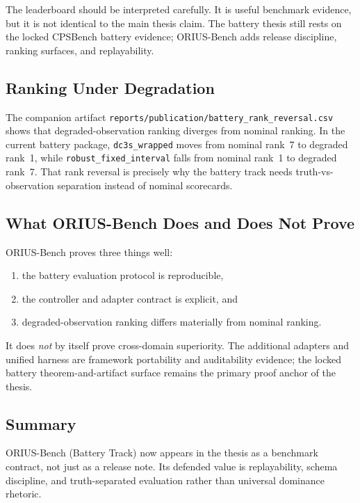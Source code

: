 The leaderboard should be interpreted carefully.  It is useful benchmark
evidence, but it is not identical to the main thesis claim.  The battery
thesis still rests on the locked CPSBench battery evidence; ORIUS-Bench adds
release discipline, ranking surfaces, and replayability.

\subsection{Ranking Under Degradation}

The companion artifact \texttt{reports/publication/battery\_rank\_reversal.csv}
shows that degraded-observation ranking diverges from nominal ranking.  In
the current battery package, \texttt{dc3s\_wrapped} moves from nominal rank~7
to degraded rank~1, while \texttt{robust\_fixed\_interval} falls from nominal
rank~1 to degraded rank~7.  That rank reversal is precisely why the battery
track needs truth-vs-observation separation instead of nominal scorecards.

\subsection{What ORIUS-Bench Does and Does Not Prove}

ORIUS-Bench proves three things well:

\begin{enumerate}
  \item the battery evaluation protocol is reproducible,
  \item the controller and adapter contract is explicit, and
  \item degraded-observation ranking differs materially from nominal ranking.
\end{enumerate}

It does \emph{not} by itself prove cross-domain superiority.  The additional
adapters and unified harness are framework portability and auditability
evidence; the locked battery theorem-and-artifact surface remains the primary
proof anchor of the thesis.

\subsection{Summary}

ORIUS-Bench (Battery Track) now appears in the thesis as a benchmark
contract, not just as a release note.  Its defended value is replayability,
schema discipline, and truth-separated evaluation rather than universal
dominance rhetoric.


